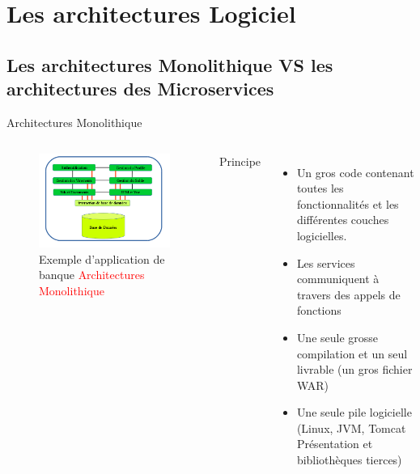 \documentclass{beamer}
\begin{document}
\section{Les architectures Logiciel}
\subsection{Les architectures Monolithique VS les architectures des Microservices}
\begin{frame}{Architectures Monolithique}
    \begin{columns}
        \begin{figure}
            \begin{center}
            \includegraphics[width=1\textwidth]{monopolitique.png}
                \caption{Exemple d'application de banque \textcolor{red}{Architectures Monolithique}}
            \end{center}
        \end{figure}
        Principe
        \begin{itemize}
            \item Un gros code contenant toutes les fonctionnalités et les
                différentes couches logicielles.
            \item Les services communiquent à travers des appels de fonctions 
            \item Une seule grosse compilation et un seul livrable (un gros fichier WAR)
            \item Une seule pile logicielle (Linux, JVM, Tomcat Présentation et bibliothèques tierces)
        \end{itemize} 
    \end{columns}

\end{frame}
\end{document}
